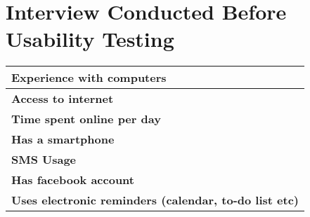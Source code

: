 \chapter{Interview Conducted Before Usability Testing}
\label{app:interviews-before-usability-testing}


\begin{center}
	\begin{tabular}{ | p{13.5cm} | }
		\hline
		\textbf{Experience with computers} \\[5ex] \hline
		\textbf{Access to internet} \\[5ex] \hline
		\textbf{Time spent online per day} \\[5ex] \hline
		\textbf{Has a smartphone} \\[5ex] \hline
		\textbf{SMS Usage} \\[5ex] \hline
		\textbf{Has facebook account} \\[5ex] \hline
		\textbf{Uses electronic reminders (calendar, to-do list etc)} \\ [5ex] \hline
	\end{tabular}
\end{center}
